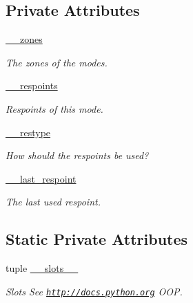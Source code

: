 \subsection*{Private Attributes}
\begin{DoxyCompactItemize}
\item 
\hyperlink{class_mode_1_1_mode_a0672655c12a3e18e65d084c395d9378c}{\_\-\_\-zones}
\begin{DoxyCompactList}\small\item\em The zones of the modes. \item\end{DoxyCompactList}\item 
\hyperlink{class_mode_1_1_mode_a2e07ed5d08d3ced387d24587f8a87967}{\_\-\_\-respoints}
\begin{DoxyCompactList}\small\item\em Respoints of this mode. \item\end{DoxyCompactList}\item 
\hyperlink{class_mode_1_1_mode_a1fd32aea9872573e444d08b65ec28ef2}{\_\-\_\-restype}
\begin{DoxyCompactList}\small\item\em How should the respoints be used? \item\end{DoxyCompactList}\item 
\hyperlink{class_mode_1_1_mode_a93dd6d85da76655a5ca8f5a4873109f9}{\_\-\_\-last\_\-respoint}
\begin{DoxyCompactList}\small\item\em The last used respoint. \item\end{DoxyCompactList}\end{DoxyCompactItemize}
\subsection*{Static Private Attributes}
\begin{DoxyCompactItemize}
\item 
tuple \hyperlink{class_mode_1_1_mode_a6f65d9a9362971bd8896a81a0d71c642}{\_\-\_\-slots\_\-\_\-}
\begin{DoxyCompactList}\small\item\em Slots  See \href{http://docs.python.org}{\tt http://docs.python.org} OOP. \item\end{DoxyCompactList}\end{DoxyCompactItemize}


